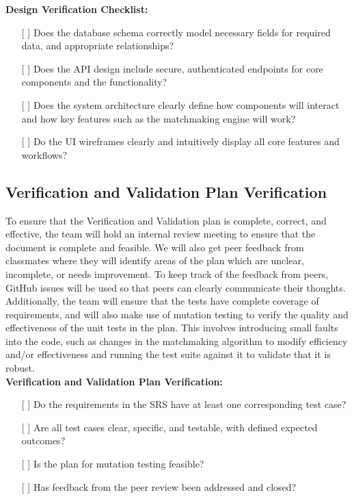 \documentclass[12pt, titlepage]{article}
\begin{document}
\noindent \textbf{Design Verification Checklist:}
\begin{itemize}
  \item[{[ ]}] Does the database schema correctly model necessary fields for required data, and appropriate relationships? 
  \item[{[ ]}] Does the API design include secure, authenticated endpoints for core components and the functionality? 
  \item[{[ ]}] Does the system architecture clearly define how components will interact and how key features such as the matchmaking engine will work? 
  \item[{[ ]}] Do the UI wireframes clearly and intuitively display all core features and workflows? 
\end{itemize}
\subsection{Verification and Validation Plan Verification}

To ensure that the Verification and Validation plan is complete, correct, and effective, the team will hold an internal review meeting to ensure that the document is complete and feasible. We will also get peer feedback from classmates where they will identify areas of the plan which are unclear, incomplete, or needs improvement. 
To keep track of the feedback from peers, GitHub issues will be used so that peers can clearly communicate their thoughts. Additionally, the team will ensure that the tests have complete coverage of requirements, and will also make use of mutation testing to verify the quality and effectiveness of the unit tests in the plan. 
This involves introducing small faults into the code, such as changes in the matchmaking algorithm to modify efficiency and/or effectiveness and running the test suite against it to validate that it is robust. \\

\noindent \textbf{Verification and Validation Plan Verification:}
\begin{itemize}
  \item[{[ ]}] Do the requirements in the SRS have at least one corresponding test case?
  \item[{[ ]}] Are all test cases clear, specific, and testable, with defined expected outcomes? 
  \item[{[ ]}] Is the plan for mutation testing feasible?
  \item[{[ ]}] Has feedback from the peer review been addressed and closed? 
\end{itemize}
\end{document}
